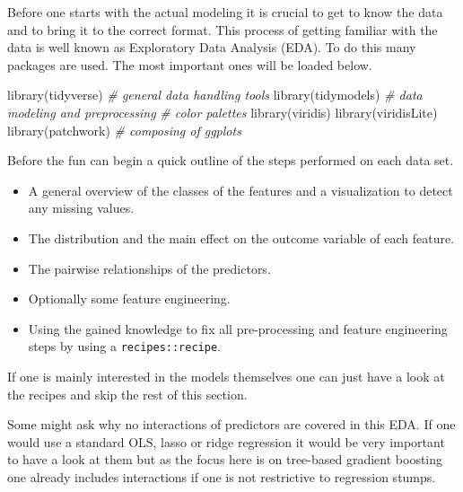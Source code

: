 \documentclass[
]{book}
\newenvironment{Shaded}{\begin{snugshade}}{\end{snugshade}}
\newcommand{\CommentTok}[1]{\textcolor[rgb]{0.56,0.35,0.01}{\textit{#1}}}
\newcommand{\FunctionTok}[1]{\textcolor[rgb]{0.00,0.00,0.00}{#1}}
\newcommand{\NormalTok}[1]{#1}
\providecommand{\tightlist}{%
  \setlength{\itemsep}{0pt}\setlength{\parskip}{0pt}}
\begin{document}
Before one starts with the actual modeling it is crucial to get to know the data and to bring it to the correct format. This process of getting familiar with the data is well known as Exploratory Data Analysis (EDA). To do this many packages are used.\citetext{\citealp{tidyverse}; \citealp{tidymodels}; \citealp{viridis}; \citealp{ggtext}; \citealp[ ]{viridisLite}; \citealp{patchwork}; \citealp{visdat}; \citealp{lubridate}; \citealp{latexplots}; \citealp{ggally}; \citealp{plotly}} The most important ones will be loaded below.

\begin{Shaded}
\begin{Highlighting}[]
\FunctionTok{library}\NormalTok{(tidyverse) }\CommentTok{\# general data handling tools}
\FunctionTok{library}\NormalTok{(tidymodels) }\CommentTok{\# data modeling and preprocessing}
\CommentTok{\# color palettes}
\FunctionTok{library}\NormalTok{(viridis)}
\FunctionTok{library}\NormalTok{(viridisLite)}
\FunctionTok{library}\NormalTok{(patchwork) }\CommentTok{\# composing of ggplots}
\end{Highlighting}
\end{Shaded}

Before the fun can begin a quick outline of the steps performed on each data set.

\begin{itemize}
\tightlist
\item
  A general overview of the classes of the features and a visualization to detect any missing values.
\item
  The distribution and the main effect on the outcome variable of each feature.
\item
  The pairwise relationships of the predictors.
\item
  Optionally some feature engineering.
\item
  Using the gained knowledge to fix all pre-processing and feature engineering steps by using a \texttt{recipes::recipe}.
\end{itemize}

If one is mainly interested in the models themselves one can just have a look at the recipes and skip the rest of this section.

Some might ask why no interactions of predictors are covered in this EDA. If one would use a standard OLS, lasso or ridge regression it would be very important to have a look at them but as the focus here is on tree-based gradient boosting one already includes interactions if one is not restrictive to regression stumps.
\end{document}
